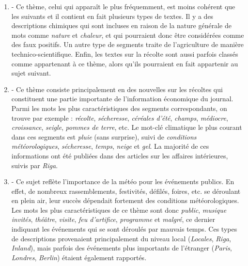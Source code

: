\documentclass[a4paper,twoside,12pt]{article}
\begin{document}
\vspace{1ex}
\begin{enumerate}
    \item \textbf{} - Ce thème, celui qui apparaît le plus fréquemment, est moins cohérent que les suivants et il contient en fait plusieurs types de textes. Il y a des descriptions chimiques qui sont incluses en raison de la nature générale de mots comme \textit{nature} et \textit{chaleur}, et qui pourraient donc être considérées comme des faux positifs. Un autre type de segments traite de l'agriculture de manière technico-scientifique. Enfin, les textes sur la récolte sont aussi parfois classés comme appartenant à ce thème, alors qu'ils pourraient en fait appartenir au sujet suivant.
    
    \item \textbf{} - Ce thème consiste principalement en des nouvelles sur les récoltes qui constituent une partie importante de l'information économique du journal. Parmi les mots les plus caractéristiques des segments correspondants, on trouve par exemple : \textit{récolte}, \textit{sécheresse}, \textit{céréales d'été}, \textit{champs}, \textit{médiocre}, \textit{croissance}, \textit{seigle}, \textit{pommes de terre}, etc.  Le mot-clé climatique le plus courant dans ces segments est \textit{pluie} (sans surprise), suivi de \textit{conditions météorologiques}, \textit{sécheresse}, \textit{temps}, \textit{neige} et \textit{gel}. La majorité de ces informations ont été publiées dans des articles sur les affaires intérieures, suivis par \textit{Riga}.

    \item \textbf{} - Ce sujet reflète l'importance de la météo pour les événements publics. En effet, de nombreux rassemblements, festivités, défilés, foires, etc. se déroulant en plein air, leur succès dépendait fortement des conditions météorologiques. Les mots les plus caractéristiques de ce thème sont donc \textit{public}, \textit{musique} \textit{invités}, \textit{théâtre}, \textit{visite}, \textit{feu d'artifice}, \textit{programme} et \textit{malgré}, ce dernier indiquant les événements qui se sont déroulés par mauvais temps. Ces types de descriptions provenaient principalement du niveau local (\textit{Locales}, \textit{Riga}, \textit{Inland}), mais parfois des événements plus importants de l'étranger (\textit{Paris}, \textit{Londres}, \textit{Berlin}) étaient également rapportés.
    

\end{enumerate}
\end{document}
